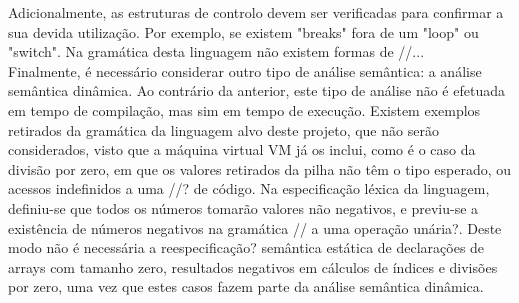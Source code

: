 Adicionalmente, as estruturas de controlo devem ser verificadas para confirmar a sua devida utilização.
Por exemplo, se existem "breaks" fora de um "loop" ou "switch". Na gramática desta linguagem não existem
formas de //...\\

Finalmente, é necessário considerar outro tipo de análise semântica: a análise semântica dinâmica.
Ao contrário da anterior, este tipo de análise não é efetuada em tempo de compilação, mas sim
em tempo de execução. Existem exemplos retirados da gramática da linguagem alvo deste projeto, que 
não serão considerados, visto que a máquina virtual VM já os inclui, como é o caso da divisão por
zero, em que os valores retirados da pilha não têm o tipo esperado, ou acessos indefinidos a uma
//? de código. Na especificação léxica da linguagem, definiu-se que todos os números tomarão valores
não negativos, e previu-se a existência de números negativos na gramática // a uma operação unária?. 
Deste modo não é necessária a reespecificação? semântica estática de declarações de arrays com
tamanho zero, resultados negativos em cálculos de índices e divisões por zero, uma vez que estes 
casos fazem parte da análise semântica dinâmica.\\












